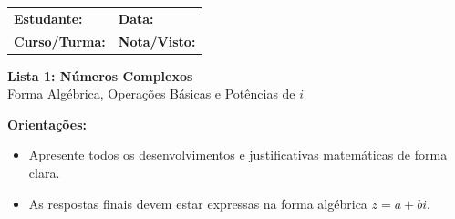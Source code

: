 \documentclass[12pt,a4paper]{article}
\begin{document}
\begin{tcolorbox}[colback=bglight, colframe=primary, boxrule=1pt, arc=3pt]
  \sffamily\small
  \begin{tabular}{@{}p{} p{}@{}}
    \textbf{Estudante:} \hrulefill & \textbf{Data:} \hrulefill \\[0.25cm]
    \textbf{Curso/Turma:} \hrulefill & \textbf{Nota/Visto:} \hrulefill
  \end{tabular}
\end{tcolorbox}

\begin{center}
  {\LARGE\bfseries\color{primary} Lista 1: Números Complexos} \\[0.1cm]
  {\small\sffamily\color{gray} Forma Algébrica, Operações Básicas e Potências de $i$}
\end{center}

\begin{tcolorbox}[colback=white, colframe=borderlight, boxrule=0.5pt, arc=2pt]
  \small\sffamily\textcolor{primary}{\textbf{Orientações:}}
  \begin{itemize}[leftmargin=*, noitemsep, topsep=2pt]
    \item Apresente todos os desenvolvimentos e justificativas matemáticas de forma clara.
    \item As respostas finais devem estar expressas na forma algébrica $z = a + bi$.
  \end{itemize}
\end{tcolorbox}

\vspace{0.2cm}

\end{document}
